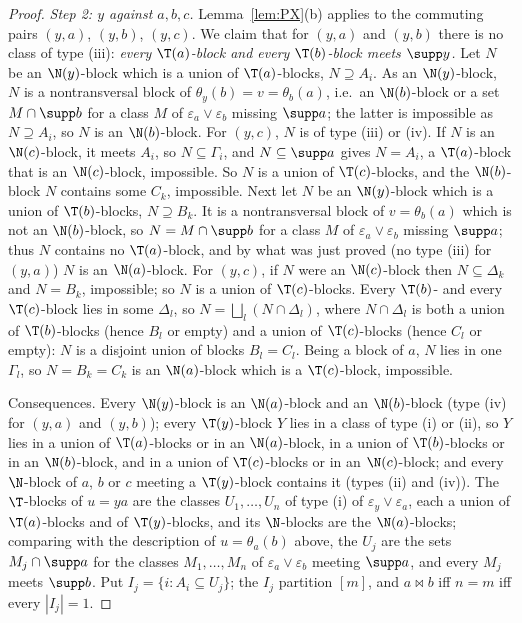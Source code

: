 \begin{proof}
\smallskip\emph{Step 2: $y$ against $a,b,c$.} Lemma~\ref{lem:PX}(b) applies to the commuting pairs $(y,a)$, $(y,b)$, $(y,c)$. We claim that for $(y,a)$ and $(y,b)$ there is no class of type (iii): \emph{every $\T(a)$-block and every $\T(b)$-block meets $\supp y$.} Let $N$ be an $\N(y)$-block which is a union of $\T(a)$-blocks, $N\supseteq A_i$. As an $\N(y)$-block, $N$ is a nontransversal block of $\theta_y(b)=v=\theta_b(a)$, i.e.\ an $\N(b)$-block or a set $M\cap\supp b$ for a class $M$ of $\varepsilon_a\vee\varepsilon_b$ missing $\supp a$; the latter is impossible as $N\supseteq A_i$, so $N$ is an $\N(b)$-block. For $(y,c)$, $N$ is of type (iii) or (iv). If $N$ is an $\N(c)$-block, it meets $A_i$, so $N\subseteq\Gamma_i$, and $N\subseteq\supp a$ gives $N=A_i$, a $\T(a)$-block that is an $\N(c)$-block, impossible. So $N$ is a union of $\T(c)$-blocks, and the $\N(b)$-block $N$ contains some $C_k$, impossible. Next let $N$ be an $\N(y)$-block which is a union of $\T(b)$-blocks, $N\supseteq B_k$. It is a nontransversal block of $v=\theta_b(a)$ which is not an $\N(b)$-block, so $N=M\cap\supp b$ for a class $M$ of $\varepsilon_a\vee\varepsilon_b$ missing $\supp a$; thus $N$ contains no $\T(a)$-block, and by what was just proved (no type (iii) for $(y,a)$) $N$ is an $\N(a)$-block. For $(y,c)$, if $N$ were an $\N(c)$-block then $N\subseteq\Delta_k$ and $N=B_k$, impossible; so $N$ is a union of $\T(c)$-blocks. Every $\T(b)$- and every $\T(c)$-block lies in some $\Delta_l$, so $N=\bigsqcup_l(N\cap\Delta_l)$, where $N\cap\Delta_l$ is both a union of $\T(b)$-blocks (hence $B_l$ or empty) and a union of $\T(c)$-blocks (hence $C_l$ or empty): $N$ is a disjoint union of blocks $B_l=C_l$. Being a block of $a$, $N$ lies in one $\Gamma_l$, so $N=B_k=C_k$ is an $\N(a)$-block which is a $\T(c)$-block, impossible.

Consequences. Every $\N(y)$-block is an $\N(a)$-block and an $\N(b)$-block (type (iv) for $(y,a)$ and $(y,b)$); every $\T(y)$-block $Y$ lies in a class of type (i) or (ii), so $Y$ lies in a union of $\T(a)$-blocks or in an $\N(a)$-block, in a union of $\T(b)$-blocks or in an $\N(b)$-block, and in a union of $\T(c)$-blocks or in an $\N(c)$-block; and every $\N$-block of $a$, $b$ or $c$ meeting a $\T(y)$-block contains it (types (ii) and (iv)). The $\T$-blocks of $u=ya$ are the classes $U_1,\dots,U_n$ of type (i) of $\varepsilon_y\vee\varepsilon_a$, each a union of $\T(a)$-blocks and of $\T(y)$-blocks, and its $\N$-blocks are the $\N(a)$-blocks; comparing with the description of $u=\theta_a(b)$ above, the $U_j$ are the sets $M_j\cap\supp a$ for the classes $M_1,\dots,M_n$ of $\varepsilon_a\vee\varepsilon_b$ meeting $\supp a$, and every $M_j$ meets $\supp b$. Put $I_j=\{i:A_i\subseteq U_j\}$; the $I_j$ partition $[m]$, and $a\bowtie b$ iff $n=m$ iff every $|I_j|=1$.


\end{proof}
